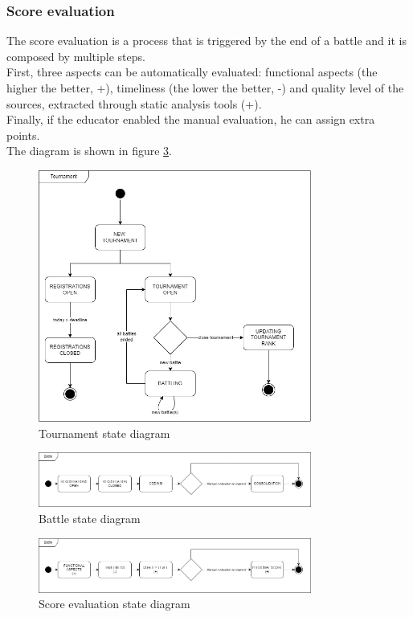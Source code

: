 \subsubsection*{Score evaluation}
The score evaluation is a process that is triggered by the end of a battle and it is composed by multiple steps.\\
First, three aspects can be automatically evaluated: functional aspects (the higher the better, +), timeliness (the lower the better, -) and quality level of the sources, extracted through static analysis tools (+). \\
Finally, if the educator enabled the manual evaluation, he can assign extra points. \\
The diagram is shown in figure \ref{fig:score-evaluation-state-diagram}.\\

\begin{figure}[H]
    \centering
    \includegraphics[width=0.8\textwidth]{state_diagrams/tournament.jpg}
    \caption{Tournament state diagram}
    \label{fig:tournament-state-diagram}
\end{figure}
\begin{figure}[H]
    \centering
    \includegraphics[width=0.8\textwidth]{state_diagrams/battle.jpg}
    \caption{Battle state diagram}
    \label{fig:battle-state-diagram}
\end{figure}
\begin{figure}[H]
    \centering
    \includegraphics[width=0.8\textwidth]{state_diagrams/score_evaluation.jpg}
    \caption{Score evaluation state diagram}
    \label{fig:score-evaluation-state-diagram}
\end{figure}

